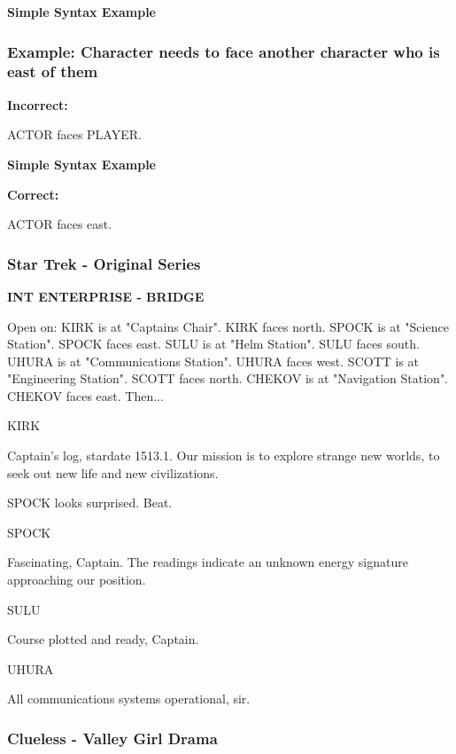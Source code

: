 \documentclass[11pt,letterpaper,oldstylefigures]{memoir}
\newcommand{\slugline}[1]{\nobreak\textbf{\MakeUppercase{#1}}\par\nobreak\vspace{1\baselineskip}}
\newcommand{\speaker}[1]{\nobreak\hspace*{0.333\textwidth}\MakeUppercase{#1}\par\nobreak\vspace{0.5\baselineskip}}
\newcommand{\dialogue}[1]{\nobreak\hspace*{0.25\textwidth}\begin{minipage}{0.5\textwidth}#1\end{minipage}\par\vspace{1\baselineskip}}
\newcommand{\stagedir}[1]{#1\par\vspace{1\baselineskip}}
\newenvironment{FountainExample}
  {\begingroup
  \ttfamily\small
   \setlength{\parindent}{0pt}
  \setlength{\parskip}{0.5em}
  \allowdisplaybreaks
  \setlength{\displaywidowpenalty}{0}
  \setlength{\widowpenalty}{0}
  \setlength{\clubpenalty}{0}
  \setlength{\interlinepenalty}{0}
}
  {\endgroup}
\newenvironment{SimpleExample}
{\begingroup
\small
\setlength{\parindent}{0pt}
\setlength{\parskip}{0.5em}
\allowdisplaybreaks
\setlength{\displaywidowpenalty}{0}
\setlength{\widowpenalty}{0}
\setlength{\clubpenalty}{0}
\setlength{\interlinepenalty}{0}
\begin{tcolorbox}[
    colback=blue!5,
    colframe=blue!75!black,
    boxrule=0.5pt,
    arc=2pt,
    left=0.5em,
    right=0.5em,
    top=0.25em,
    bottom=0.25em
]
\textbf{Simple Syntax Example}
\end{tcolorbox}\par
}
{\endgroup}
\newcommand{\paragraphbreak}{\vspace{0.5em}}
\begin{document}
\begin{SimpleExample}
\subsubsection{Example: Character needs to face another character who is east of them}
\textbf{Incorrect:}
\begin{FountainExample}
\stagedir{ACTOR faces PLAYER.}
\end{FountainExample}
\end{SimpleExample}

\begin{SimpleExample}
\textbf{Correct:}
\begin{FountainExample}
\stagedir{ACTOR faces east.}
\end{FountainExample}
\end{SimpleExample}

\paragraphbreak

\subsubsection*{Star Trek - Original Series}
\label{ex:star-trek-original-series-1}

\begin{FountainExample}
\slugline{INT ENTERPRISE - BRIDGE}

\stagedir{Open on: KIRK is at "Captains Chair". KIRK faces north. SPOCK is at "Science Station". SPOCK faces east. SULU is at "Helm Station". SULU faces south. UHURA is at "Communications Station". UHURA faces west. SCOTT is at "Engineering Station". SCOTT faces north. CHEKOV is at "Navigation Station". CHEKOV faces east. Then...}

\speaker{KIRK}
\dialogue{Captain's log, stardate 1513.1. Our mission is to explore strange new worlds,
to seek out new life and new civilizations.}

\stagedir{SPOCK looks surprised. Beat.}

\speaker{SPOCK}
\dialogue{Fascinating, Captain. The readings indicate an unknown energy signature approaching our position.}

\speaker{SULU}
\dialogue{Course plotted and ready, Captain.}

\speaker{UHURA}
\dialogue{All communications systems operational, sir.}
\end{FountainExample}
\paragraphbreak
\subsubsection*{Clueless - Valley Girl Drama}
\label{ex:clueless-valley-girl-drama-1}
\end{document}
